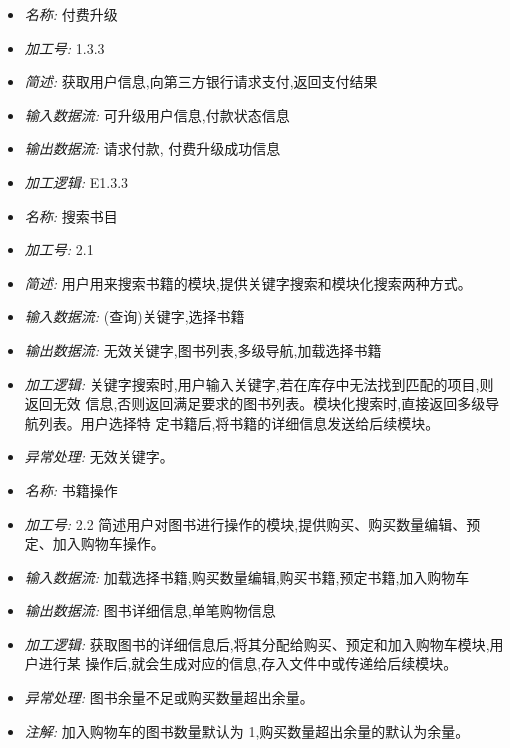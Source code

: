 \documentclass{article}
\begin{document}
\begin{CJK*}{UTF8}{gbsn}
\begin{itemize}
\item \textit{名称: } 付费升级
\item \textit{加工号: } 1.3.3
\item \textit{简述: } 获取用户信息,向第三方银行请求支付,返回支付结果 
\item \textit{输入数据流: } 可升级用户信息,付款状态信息
\item \textit{输出数据流: } 请求付款, 付费升级成功信息
\item \textit{加工逻辑: } E1.3.3

\end{itemize}


\vspace{-1mm}


\begin{itemize}
\item \textit{名称: }搜索书目
\item \textit{加工号: }2.1
\item \textit{简述: }用户用来搜索书籍的模块,提供关键字搜索和模块化搜索两种方式。 
\item \textit{输入数据流: }(查询)关键字,选择书籍 
\item \textit{输出数据流: }无效关键字,图书列表,多级导航,加载选择书籍 
\item \textit{加工逻辑: }关键字搜索时,用户输入关键字,若在库存中无法找到匹配的项目,则返回无效 信息,否则返回满足要求的图书列表。模块化搜索时,直接返回多级导航列表。用户选择特 定书籍后,将书籍的详细信息发送给后续模块。
\item \textit{异常处理: }无效关键字。

\end{itemize}


\vspace{-1mm}


\begin{itemize}
\item \textit{名称: } 书籍操作
\item \textit{加工号: }2.2 简述用户对图书进行操作的模块,提供购买、购买数量编辑、预定、加入购物车操作。 
\item \textit{输入数据流: }加载选择书籍,购买数量编辑,购买书籍,预定书籍,加入购物车 
\item \textit{输出数据流: }图书详细信息,单笔购物信息 
\item \textit{加工逻辑: }获取图书的详细信息后,将其分配给购买、预定和加入购物车模块,用户进行某 操作后,就会生成对应的信息,存入文件中或传递给后续模块。 
\item \textit{异常处理: }图书余量不足或购买数量超出余量。
\item \textit{注解: }加入购物车的图书数量默认为 1,购买数量超出余量的默认为余量。


\end{itemize}
\end{CJK*}
\end{document}
